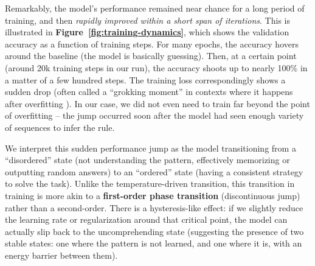 \documentclass[12pt]{article}
\begin{document}
Remarkably, the model's performance remained near chance for a long period of training, and then \emph{rapidly improved within a short span of iterations}. This is illustrated in \textbf{Figure~\ref{fig:training-dynamics}}, which shows the validation accuracy as a function of training steps. For many epochs, the accuracy hovers around the baseline (the model is basically guessing). Then, at a certain point (around 20k training steps in our run), the accuracy shoots up to nearly 100\% in a matter of a few hundred steps. The training loss correspondingly shows a sudden drop (often called a ``grokking moment'' in contexts where it happens after overfitting \citep{power2022}). In our case, we did not even need to train far beyond the point of overfitting -- the jump occurred soon after the model had seen enough variety of sequences to infer the rule.


We interpret this sudden performance jump as the model transitioning from a ``disordered'' state (not understanding the pattern, effectively memorizing or outputting random answers) to an ``ordered'' state (having a consistent strategy to solve the task). Unlike the temperature-driven transition, this transition in training is more akin to a \textbf{first-order phase transition} (discontinuous jump) rather than a second-order. There is a hysteresis-like effect: if we slightly reduce the learning rate or regularization around that critical point, the model can actually slip back to the uncomprehending state (suggesting the presence of two stable states: one where the pattern is not learned, and one where it is, with an energy barrier between them).
\end{document}
